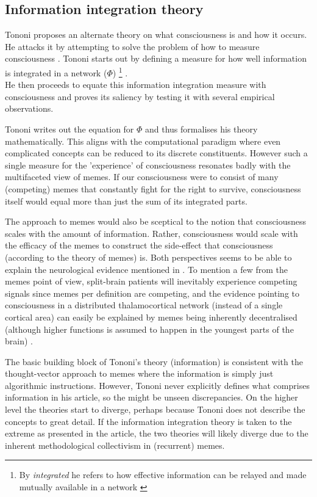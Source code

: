 \documentclass[a4paper,oneside]{memoir}
\begin{document}
\subsection{Information integration theory}
Tononi proposes an alternate theory on what consciousness is and how it occurs. He attacks
it by attempting to solve the problem of how to measure consciousness \autocite{Tononi2004}.
Tononi starts out by defining a
measure for how well information is integrated in a network ($\Phi$)
\footnote{By 
\textit{integrated} he refers to how effective information can be relayed and made mutually 
available in a network \autocite{Tononi2004} }
\autocite{Tononi2004}. \\
He then proceeds to equate this information
integration measure with consciousness and proves its saliency by testing it with
several empirical observations.

Tononi writes out the equation for $\Phi$ and thus formalises his theory mathematically.
This aligns with the computational paradigm where even complicated concepts can be
reduced to its discrete constituents. However such a single measure for the 'experience'
of consciousness resonates badly with the multifaceted view of memes. If our
consciousness were to consist of many (competing) memes that constantly fight for
the right to survive, consciousness itself would equal more than just the sum of
its integrated parts.

The approach to memes would also be sceptical to the notion that consciousness scales
with the amount of information. Rather, consciousness would scale with the
efficacy of the memes to construct the side-effect that consciousness (according
to the theory of memes) is. Both perspectives seems to be able to explain the 
neurological evidence mentioned in \textcite{Tononi2004}. To mention a few from the 
memes point of view, split-brain
patients will inevitably experience competing signals since memes per
definition are competing, and the evidence pointing to consciousness in a
distributed thalamocortical network (instead of a single cortical area) can easily
be explained by memes being inherently decentralised (although higher functions
is assumed to happen in the youngest parts of the brain) \autocite{dennett2017, Tononi2004}.

The basic building block of Tononi's theory (information) is consistent with the
thought-vector approach to \gls{meme}s where the information is simply just algorithmic
instructions. However, Tononi never explicitly defines what comprises information in
his article, so the might be unseen discrepancies. On the higher level the theories
start to diverge, perhaps because Tononi does not describe the concepts to great detail.
If the information integration theory is taken to the extreme as presented in the article,
the two theories will likely diverge due to the inherent methodological collectivism
in (recurrent) \gls{meme}s.
\end{document}
